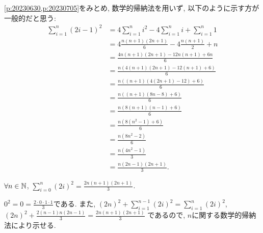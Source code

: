\begin{rem}
  \cref{p:20230630,p:20230705}をみとめ,
  数学的帰納法を用いず, 以下のように示す方が一般的だと思う:
  \begin{align*}
    \sum_{i=1}^{n}(2i-1)^2&=
    4\sum_{i=1}^{n}i^2-4\sum_{i=1}^n i+\sum_{i=1}^n 1\\
    &=
    4\frac{n(n+1)(2n+1)}{6}
    -4\frac{n(n+1)}{2}+n\\
    &=\frac{4n(n+1)(2n+1)-12n(n+1)+6n}{6}\\
    &=\frac{n(4(n+1)(2n+1)-12(n+1)+6)}{6}\\
    &=\frac{n((n+1)(4(2n+1)-12)+6)}{6}\\
    &=\frac{n((n+1)(8n-8)+6)}{6}\\
    &=\frac{n(8(n+1)(n-1)+6)}{6}\\
    &=\frac{n(8(n^2-1)+6)}{6}\\
    &=\frac{n(8n^2-2)}{6}\\
    &=\frac{n(4n^2-1)}{3}\\
    &=\frac{n(2n-1)(2n+1)}{3}.
  \end{align*}
\end{rem}


\begin{prop}
  \label{p:20230707}
  $\forall n\in\mathbb{N}$, $\sum_{i=0}^{n}(2i)^2=\frac{2n(n+1)(2n+1)}{3}$.
\end{prop}
\begin{proof**}
  $0^2=0=\frac{2\cdot 0\cdot 1\cdot 1}{3}$である.
  また,
    $(2n)^2+\sum_{i=1}^{n-1}(2i)^2=\sum_{i=1}^{n}(2i)^2$,
    $(2n)^2+\frac{2(n-1)n(2n-1)}{3}=\frac{2n(n+1)(2n+1)}{3}$
  であるので,
  $n$に関する数学的帰納法により示せる.
\end{proof**}


